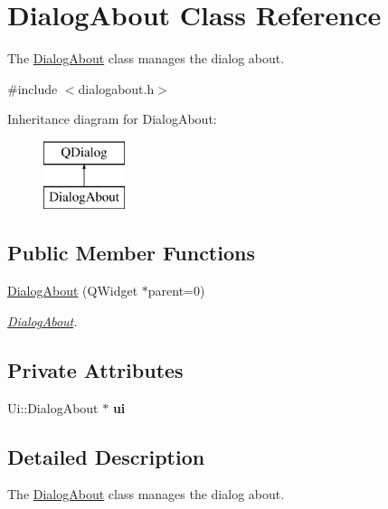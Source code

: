 \hypertarget{classDialogAbout}{\section{Dialog\-About Class Reference}
\label{classDialogAbout}
}


The \hyperlink{classDialogAbout}{Dialog\-About} class manages the dialog about.  




{\ttfamily \#include $<$dialogabout.\-h$>$}

Inheritance diagram for Dialog\-About\-:\begin{figure}[H]
\begin{center}
\leavevmode
\includegraphics[height=2.000000cm]{classDialogAbout}
\end{center}
\end{figure}
\subsection*{Public Member Functions}
\begin{DoxyCompactItemize}
\item 
\hyperlink{classDialogAbout_a190b23e7ee6baf399a1a026c1a400e53}{Dialog\-About} (Q\-Widget $\ast$parent=0)
\begin{DoxyCompactList}\small\item\em \hyperlink{classDialogAbout}{Dialog\-About}. \end{DoxyCompactList}\end{DoxyCompactItemize}
\subsection*{Private Attributes}
\begin{DoxyCompactItemize}
\item 
\hypertarget{classDialogAbout_a8e0c8d0c6820f9f8b7f97ac625f15e2c}{Ui\-::\-Dialog\-About $\ast$ {\bfseries ui}}\label{classDialogAbout_a8e0c8d0c6820f9f8b7f97ac625f15e2c}

\end{DoxyCompactItemize}


\subsection{Detailed Description}
The \hyperlink{classDialogAbout}{Dialog\-About} class manages the dialog about. 

